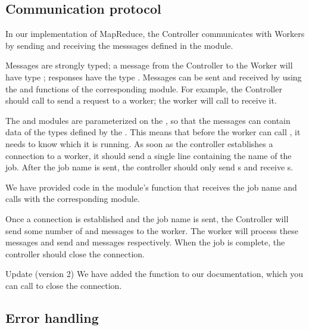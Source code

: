 \documentclass{pset}
\begin{document}
\subsection*{Communication protocol}

In our implementation of MapReduce, the Controller communicates with Workers
by sending and receiving the messsages defined in the  module.

Messages are strongly typed; a message from the Controller to the Worker will
have type ; responses have the type
.  Messages can be sent and received by using the
 and  functions of the corresponding module.  For
example, the Controller should call  to send a request
to a worker; the worker will call  to receive it.

The  and  modules are parameterized on
the , so that the messages can contain data of the types defined by
the .  This means that before the worker can call , it
needs to know which  it is running.  As soon as the controller
establishes a connection to a worker, it should send a single line containing
the name of the job.  After the job name is sent, the controller should only
send s and receive s.

We have provided code in the  module's  function that
receives the job name and calls  with the corresponding
module.

Once a connection is established and the job name is sent, the Controller will
send some number of  and
 messages to the worker.  The worker will
process these messages and send  and
 messages respectively.  When the job is
complete, the controller should close the connection.

\begin{note}{Update (version 2)}
\label{update:shutdown}
We have added the function  to our
documentation, which you can call to close the connection.
\end{note}

\subsection*{Error handling}
\end{document}

